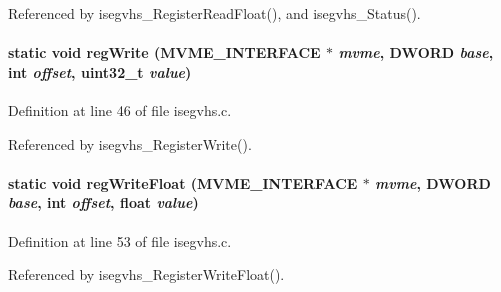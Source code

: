 Referenced by isegvhs\_\-RegisterReadFloat(), and isegvhs\_\-Status().
\paragraph[{regWrite}]{\setlength{\rightskip}{0pt plus 5cm}static void regWrite ({\bf MVME\_\-INTERFACE} $\ast$ {\em mvme}, \/  {\bf DWORD} {\em base}, \/  int {\em offset}, \/  uint32\_\-t {\em value})}\hfill\label{isegvhs_8c_a339b5d8afd6890a2c3c6c659701170e3}


Definition at line 46 of file isegvhs.c.

Referenced by isegvhs\_\-RegisterWrite().
\paragraph[{regWriteFloat}]{\setlength{\rightskip}{0pt plus 5cm}static void regWriteFloat ({\bf MVME\_\-INTERFACE} $\ast$ {\em mvme}, \/  {\bf DWORD} {\em base}, \/  int {\em offset}, \/  float {\em value})}\hfill\label{isegvhs_8c_a868570ad85a72f024c37d2c3697b1c75}


Definition at line 53 of file isegvhs.c.

Referenced by isegvhs\_\-RegisterWriteFloat().